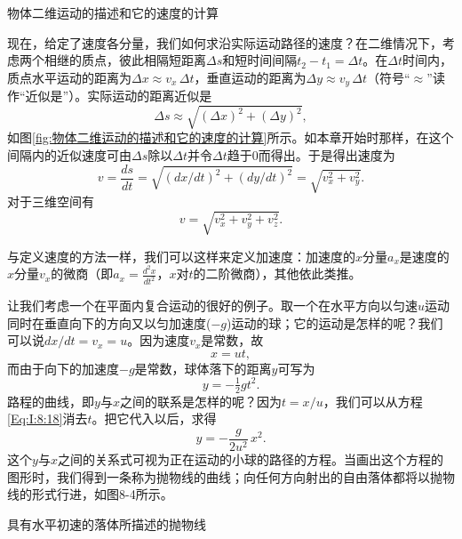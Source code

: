 \documentclass[12pt,oneside]{book}
\begin{document}
\vspace{20pt}
\begin{fig}{物体二维运动的描述和它的速度的计算}
\caption{物体二维运动的描述和它的速度的计算}
\label{fig:物体二维运动的描述和它的速度的计算}
\end{fig}
现在，给定了速度各分量，我们如何求沿实际运动路径的速度？在二维情况下，考虑两个相继的质点，彼此相隔短距离$\Delta s$和短时间间隔$t_2-t_1=\Delta t$。在$\Delta t$时间内，质点水平运动的距离为$\Delta x\approx v_x\,\Delta t$，垂直运动的距离为$\Delta y\approx v_y\,\Delta t$（符号“$\approx$”读作“近似是”）。实际运动的距离近似是
\begin{equation}
\label{Eq:I:8:14}
\Delta s\approx\sqrt{(\Delta x)^2+(\Delta y)^2},
\end{equation}
如图\ref{fig:物体二维运动的描述和它的速度的计算}所示。如本章开始时那样，在这个间隔内的近似速度可由$\Delta s$除以$\Delta t$并令$\Delta t$趋于0而得出。于是得出速度为
\begin{equation}
\label{Eq:I:8:15}
v=\frac{ds}{dt}=\sqrt{(dx/dt)^2+(dy/dt)^2}=\sqrt{v_x^2+v_y^2}.
\end{equation}
对于三维空间有
\begin{equation}
\label{Eq:I:8:16}
v=\sqrt{v_x^2+v_y^2+v_z^2}.
\end{equation}

与定义速度的方法一样，我们可以这样来定义加速度：加速度的$x$分量$a_x$是速度的$x$分量$v_x$的微商（即$a_x=\frac{d^2x}{dt^2}$，$x$对$t$的二阶微商），其他依此类推。

让我们考虑一个在平面内复合运动的很好的例子。取一个在水平方向以匀速$u$运动同时在垂直向下的方向又以匀加速度($-g$)运动的球；它的运动是怎样的呢？我们可以说$dx/dt=v_x=u$。因为速度$v_x$是常数，故
\begin{equation}
\label{Eq:I:8:17}
x=ut,
\end{equation}
而由于向下的加速度$-g$是常数，球体落下的距离$y$可写为
\begin{equation}
\label{Eq:I:8:18}
y=-\tfrac{1}{2}gt^2.
\end{equation}
路程的曲线，即$y$与$x$之间的联系是怎样的呢？因为$t=x/u$，我们可以从方程\eqref{Eq:I:8:18}消去$t$。把它代入以后，求得
\begin{equation}
\label{Eq:I:8:19}
y=-\frac{g}{2u^2}\,x^2.
\end{equation}
这个$y$与$x$之间的关系式可视为正在运动的小球的路径的方程。当画出这个方程的图形时，我们得到一条称为抛物线的曲线；向任何方向射出的自由落体都将以抛物线的形式行进，如图8-4所示。 

\begin{fig}{具有水平初速的落体所描述的抛物线}
\caption{具有水平初速的落体所描述的抛物线}
\label{fig:具有水平初速的落体所描述的抛物线}
\end{fig}
\end{document}
